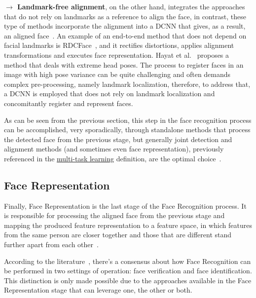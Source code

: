 \documentclass[class=report, crop=false, a4paper, 12pt]{standalone}
\begin{document}
\vspace{0.7\baselineskip}
\noindent\textbf{$\rightarrow$ Landmark-free alignment}, on the other hand, integrates the approaches that do not rely on landmarks as a reference to align the face, in contrast, these type of methods incorporate the alignment into a DCNN that gives, as a result, an aligned face~\autocite{duElementsEndtoendDeep2022}. An example of an end-to-end method that does not depend on facial landmarks is RDCFace~\autocite{zhaoRDCFaceRadialDistortion2020}, and it rectifies distortions, applies alignment transformations and executes face representation. Hayat et al.~\autocite{hayatJointRegistrationRepresentation2017} proposes a method that deals with extreme head poses. The process to register faces in an image with high pose variance can be quite challenging and often demands complex pre-processing, namely landmark localization, therefore, to address that, a DCNN is employed that does not rely on landmark localization and concomitantly register and represent faces.


\vspace{0.7\baselineskip}
\par As can be seen from the previous section, this step in the face recognition process can be accomplished, very sporadically, through standalone methods that process the detected face from the previous stage, but generally joint detection and alignment methods (and sometimes even face representation), previously referenced in the \hyperref[mt learning]{multi-task learning} definition, are the optimal choice~\autocite{changFacePoseNetMakingCase2017}.

\subsection{Face Representation}
\par Finally, Face Representation is the last stage of the Face Recognition process. It is responsible for processing the aligned face from the previous stage and mapping the produced feature representation to a feature space, in which features from the same person are closer together and those that are different stand further apart from each other~\autocite{duElementsEndtoendDeep2022}.
\par According to the literature~\autocite{duElementsEndtoendDeep2022,liHandbookFaceRecognition2011,ranjanDeepLearningUnderstanding2018,schroffFaceNetUnifiedEmbedding2015,wangDeepFaceRecognition2021}, there's a consensus about how Face Recognition can be performed in two settings of operation: face verification and face identification. This distinction is only made possible due to the approaches available in the Face Representation stage that can leverage one, the other or both. 
\end{document}

